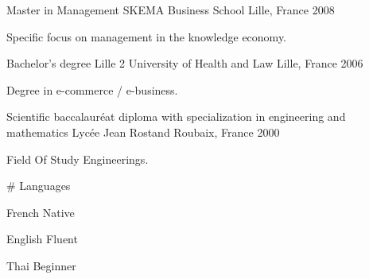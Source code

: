 

\begin{cventries}

  \cventry
    {Master in Management} %
    {SKEMA Business School} %
    {Lille, France} %
    {2008} %
    {
      \begin{cvitems} %
        \item {Specific focus on management in the knowledge economy.}
      \end{cvitems}
    }
    { } %
  \cventry
    {Bachelor's degree} %
    {Lille 2 University of Health and Law} %
    {Lille, France} %
    {2006} %
    {
      \begin{cvitems} %
        \item {Degree in e-commerce / e-business.}
      \end{cvitems}
    }
    { } %
      \cventry
        {Scientific baccalauréat diploma with specialization in engineering and mathematics} %
        {Lycée Jean Rostand} %
        {Roubaix, France} %
        {2000} %
        {
          \begin{cvitems} %
            \item {Field Of Study Engineerings.}
          \end{cvitems}
        }
        { } %
  \cventry
    {} %
    {\# Languages} %
    { } %
    { } %
    {
      \begin{cvitems} %
        \item {French Native}
        \item {English Fluent}
        \item {Thai Beginner}
      \end{cvitems}
    }
    { } %

\end{cventries}
